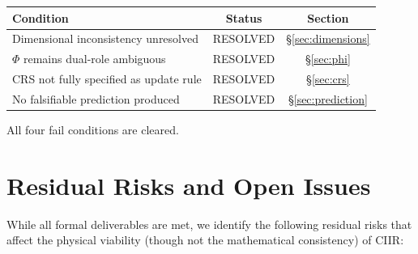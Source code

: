 \documentclass[11pt,a4paper]{article}
\theoremstyle{remark}
\begin{document}
\begin{center}
\renewcommand{\arraystretch}{1.3}
\begin{tabular}{@{}p{6cm}cc@{}}
\toprule
\textbf{Condition} & \textbf{Status} & \textbf{Section} \\
\midrule
Dimensional inconsistency unresolved & RESOLVED & \S\ref{sec:dimensions} \\
$\Phi$ remains dual-role ambiguous & RESOLVED & \S\ref{sec:phi} \\
CRS not fully specified as update rule & RESOLVED & \S\ref{sec:crs} \\
No falsifiable prediction produced & RESOLVED & \S\ref{sec:prediction} \\
\bottomrule
\end{tabular}
\end{center}

\noindent All four fail conditions are cleared.

\section{Residual Risks and Open Issues}
\label{sec:risks}

While all formal deliverables are met, we identify the following
residual risks that affect the physical viability (though not the
mathematical consistency) of CIIR:
\end{document}
